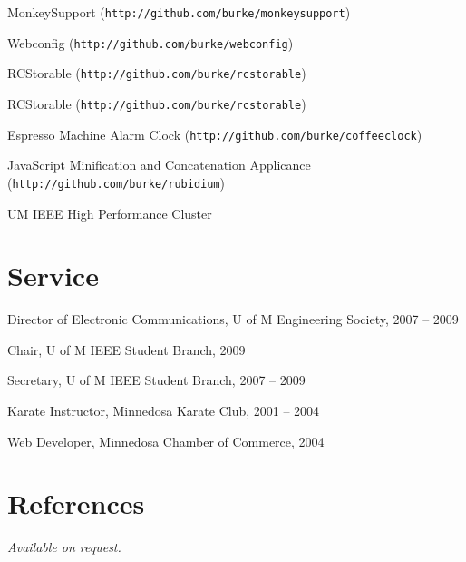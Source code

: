 \documentclass[margin,line,letterpaper]{resume}
\begin{document}
\begin{resume}
  \begin{list2}
  \item MonkeySupport ({\tt http://github.com/burke/monkeysupport})
  \item Webconfig ({\tt http://github.com/burke/webconfig})
  \item RCStorable ({\tt http://github.com/burke/rcstorable})
  \item RCStorable ({\tt http://github.com/burke/rcstorable})
  \item Espresso Machine Alarm Clock ({\tt http://github.com/burke/coffeeclock})
  \item JavaScript Minification and Concatenation Applicance ({\tt http://github.com/burke/rubidium})
  \item UM IEEE High Performance Cluster
 \end{list2}

  \section{\mysidestyle Service}

  \begin{list2}
    \item Director of Electronic Communications, U of M Engineering Society, 2007 -- 2009
    \item Chair, U of M IEEE Student Branch, 2009
    \item Secretary, U of M IEEE Student Branch, 2007 -- 2009
    \item Karate Instructor, Minnedosa Karate Club, 2001 -- 2004
    \item Web Developer, Minnedosa Chamber of Commerce, 2004
  \end{list2}

  \section{\mysidestyle References}

  {\sl Available on request.}

\end{resume}
\end{document}
